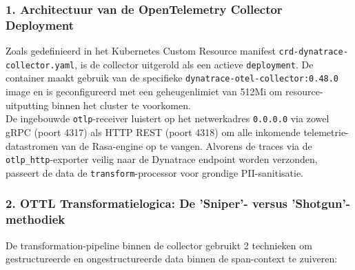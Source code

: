\subsubsection*{1. Architectuur van de OpenTelemetry Collector Deployment}
Zoals gedefinieerd in het Kubernetes Custom Resource manifest \texttt{crd-dynatrace-collector.yaml}, is de collector uitgerold als een actieve \texttt{deployment}. De container maakt gebruik van de specifieke \texttt{dynatrace-otel-collector:0.48.0} image en is geconfigureerd met een geheugenlimiet van 512Mi om resource-uitputting binnen het cluster te voorkomen.\\

De ingebouwde \texttt{otlp}-receiver luistert op het netwerkadres \texttt{0.0.0.0} via zowel gRPC (poort 4317) als HTTP REST (poort 4318) om alle inkomende telemetrie-datastromen van de Rasa-engine op te vangen. Alvorens de traces via de \texttt{otlp\_http}-exporter veilig naar de Dynatrace endpoint worden verzonden, passeert de data de \texttt{transform}-processor voor grondige PII-sanitisatie.

\subsubsection*{2. OTTL Transformatielogica: De 'Sniper'- versus 'Shotgun'-methodiek}
De transformation-pipeline binnen de collector gebruikt 2 technieken om gestructureerde en ongestructureerde data binnen de span-context te zuiveren:

